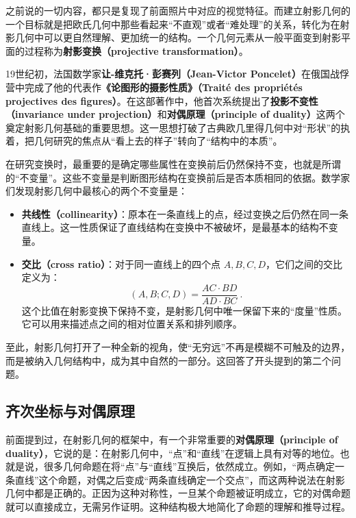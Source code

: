之前说的一切内容，都只是复现了前面照片中对应的视觉特征。而建立射影几何的一个目标就是把欧氏几何中那些看起来“不直观”或者“难处理”的关系，转化为在射影几何中可以更自然理解、更加统一的结构。一个几何元素从一般平面变到射影平面的过程称为\textbf{射影变换（projective transformation）}。

19世纪初，法国数学家\textbf{让-维克托·彭赛列（Jean-Victor Poncelet）}在俄国战俘营中完成了他的代表作\textbf{《论图形的摄影性质》（Traité des propriétés projectives des figures）}。在这部著作中，他首次系统提出了\textbf{投影不变性（invariance under projection）}和\textbf{对偶原理（principle of duality）}这两个奠定射影几何基础的重要思想。这一思想打破了古典欧几里得几何中对“形状”的执着，把几何研究的焦点从“看上去的样子”转向了“结构中的本质”。

在研究变换时，最重要的是确定哪些属性在变换前后仍然保持不变，也就是所谓的“不变量”。这些不变量是判断图形结构在变换前后是否本质相同的依据。数学家们发现射影几何中最核心的两个不变量是：
\begin{itemize}
\item \textbf{共线性（collinearity）}：原本在一条直线上的点，经过变换之后仍然在同一条直线上。这一性质保证了直线结构在变换中不被破坏，是最基本的结构不变量。
\item \textbf{交比（cross ratio）}：对于同一直线上的四个点 $A, B, C, D$，它们之间的交比定义为：
\begin{equation}
(A, B; C, D) = \frac{AC \cdot BD}{AD \cdot BC}~.
\end{equation}
这个比值在射影变换下保持不变，是射影几何中唯一保留下来的“度量”性质。它可以用来描述点之间的相对位置关系和排列顺序。
\end{itemize}

至此，射影几何打开了一种全新的视角，使“无穷远”不再是模糊不可触及的边界，而是被纳入几何结构中，成为其中自然的一部分。这回答了开头提到的第二个问题。

\subsection{齐次坐标与对偶原理}

前面提到过，在射影几何的框架中，有一个非常重要的\textbf{对偶原理（principle of duality）}，它说的是：在射影几何中，“点”和“直线”在逻辑上具有对等的地位。也就是说，很多几何命题在将“点”与“直线”互换后，依然成立。例如，“两点确定一条直线”这个命题，对偶之后变成“两条直线确定一个交点”，而这两种说法在射影几何中都是正确的。正因为这种对称性，一旦某个命题被证明成立，它的对偶命题就可以直接成立，无需另作证明。这种结构极大地简化了命题的理解和推导过程。

